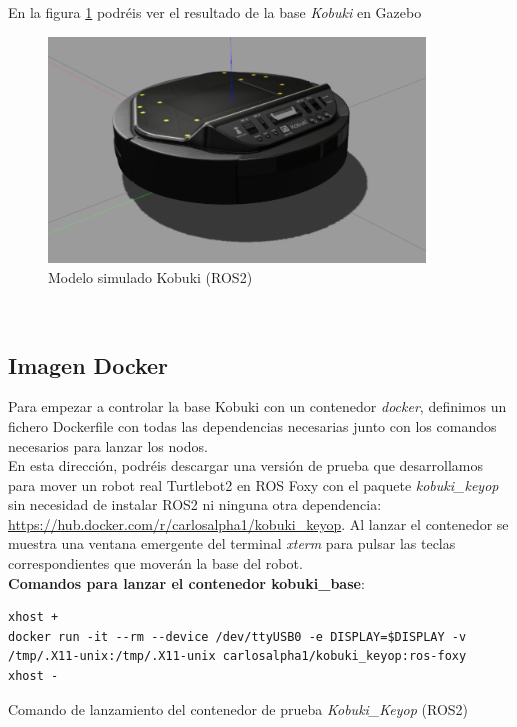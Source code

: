 En la figura \ref{fig:sim_kobuki_base} podréis ver el resultado de la base \textit{Kobuki} en Gazebo
\begin{figure} [H]
  \begin{center}
    \includegraphics[width=10cm]{imagenes/sim_kobuki_base.png}
  \end{center}
  \caption[Modelo simulado Kobuki (ROS2)]{Modelo simulado Kobuki (ROS2)}
  \label{fig:sim_kobuki_base}
\end{figure}\




\subsection{Imagen Docker}
\label{subsec:kobuki_base_docker}

Para empezar a controlar la base Kobuki con un contenedor \textit{docker}, definimos un fichero Dockerfile con todas las dependencias necesarias junto con los comandos necesarios para lanzar los nodos.\\

En esta dirección, podréis descargar una versión de prueba que desarrollamos para mover un robot real Turtlebot2 en ROS Foxy con el paquete \textit{kobuki\_keyop} sin necesidad de instalar ROS2 ni ninguna otra dependencia: \url{https://hub.docker.com/r/carlosalpha1/kobuki_keyop}. Al lanzar el contenedor se muestra una ventana emergente del terminal \textit{xterm} para pulsar las teclas correspondientes que moverán la base del robot.\\

\textbf{Comandos para lanzar el contenedor kobuki\_base}:\\
\begin{code}[H]
\begin{lstlisting}
xhost +
docker run -it --rm --device /dev/ttyUSB0 -e DISPLAY=$DISPLAY -v /tmp/.X11-unix:/tmp/.X11-unix carlosalpha1/kobuki_keyop:ros-foxy
xhost -
\end{lstlisting}
\caption{Comando de lanzamiento del contenedor de prueba \textit{Kobuki\_Keyop} (ROS2)}
\label{cod:comando_kobuki_keyop_docker}
\end{code}\

